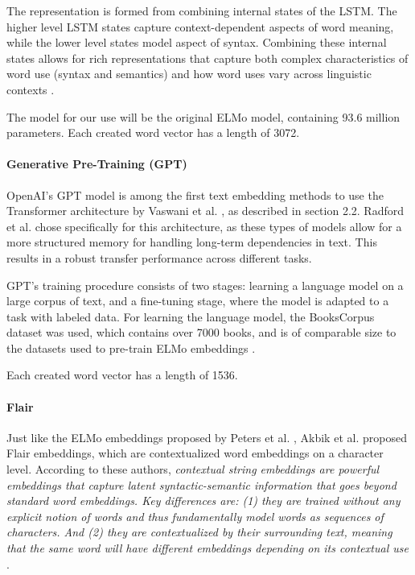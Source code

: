 The representation is formed from combining internal states of the LSTM. 
The higher level LSTM states capture context-dependent aspects of word meaning, while the lower level states model aspect of syntax.
Combining these internal states allows for rich representations that capture both complex characteristics of word use (syntax and semantics) and how word uses vary across linguistic contexts \cite{peters2018}.

The model for our use will be the original ELMo model, containing 93.6 million parameters.
Each created word vector has a length of 3072. 

\paragraph{Generative Pre-Training (GPT)}
OpenAI's GPT model is among the first text embedding methods to use the Transformer architecture by Vaswani et al. \cite{vaswani2017}, as described in section 2.2.
Radford et al. chose specifically for this architecture, as these types of models allow for a more structured memory for handling long-term dependencies in text.
This results in a robust transfer performance across different tasks. 

GPT's training procedure consists of two stages: learning a language model on a large corpus of text, and a fine-tuning stage, where the model is adapted to a task with labeled data.
For learning the language model, the BooksCorpus dataset was used, which contains over 7000 books, and is of comparable size to the datasets used to pre-train ELMo embeddings \cite{radford2018}.

Each created word vector has a length of 1536.

\paragraph{Flair}
Just like the ELMo embeddings proposed by Peters et al. \cite{peters2018}, Akbik et al. proposed Flair embeddings, which are contextualized word embeddings on a character level.
According to these authors, \textit{contextual string embeddings are powerful embeddings that capture latent syntactic-semantic information that goes beyond standard word embeddings. 
Key differences are: (1) they are trained without any explicit notion of words and thus fundamentally model words as sequences of characters. 
And (2) they are contextualized by their surrounding text, meaning that the same word will have different embeddings depending on its contextual use} \cite{flairembedding}. 


